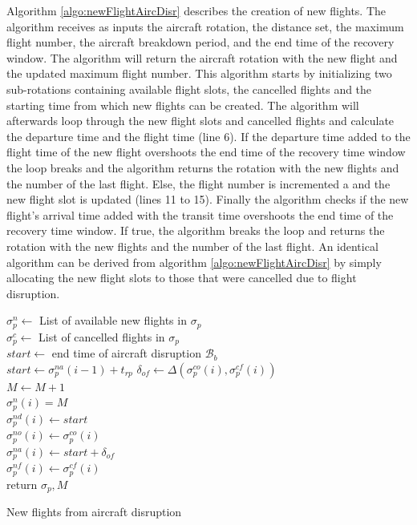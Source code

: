 	
	
	Algorithm \ref{algo:newFlightAircDisr} describes the creation of new flights. The algorithm receives as inputs the aircraft rotation, the distance set, the maximum flight number, the aircraft breakdown period, and the end time of the recovery window. The algorithm will return the aircraft rotation with the new flight and the updated maximum flight number. This algorithm starts by initializing two sub-rotations containing available flight slots, the cancelled flights and the starting time from which new flights can be created. The algorithm will afterwards loop through the new flight slots and cancelled flights and calculate the departure time and the flight time (line 6). If the departure time added to the flight time of the new flight overshoots the end time of the recovery time window the loop breaks and the algorithm returns the rotation with the new flights and the number of the last flight. Else, the flight number is incremented a and the new flight slot is updated (lines 11 to 15). Finally the algorithm checks if the new flight's arrival time added with the transit time overshoots the end time of the recovery time window. If true, the algorithm breaks the loop  and returns the rotation with the new flights and the number of the last flight. An identical algorithm can be derived from algorithm \ref{algo:newFlightAircDisr} by simply allocating the new flight slots to those that were cancelled due to flight disruption.\\
	
	\begin{algorithm}[H]
		\DontPrintSemicolon
		
		$\sigma^n_p \gets$ List of available new flights in $\sigma_p$ \\
		$\sigma^c_p \gets$ List of cancelled flights in $\sigma_p$ \\
		$start \gets$ end time of aircraft disruption $\mathcal{B}_b$\\
		{
			 { $start \gets \sigma^{na}_p(i-1)  + t_{rp}$}
			$\delta_{of} \gets \Delta(\sigma^{co}_p(i), \sigma^{cf}_p(i))$\\
			$M \gets M + 1$\\
			$\sigma^n_p(i) = M$\\
			$\sigma^{nd}_p(i) \gets start$ \\
			$\sigma^{no}_p(i) \gets \sigma^{co}_p(i)$\\
			$\sigma^{na}_p(i) \gets start + \delta_{of}$\\
			$\sigma^{nf}_p(i) \gets \sigma^{cf}_p(i)$\\
		}
		return $\sigma_p, M$
		\caption{New flights from aircraft disruption}
		\label{algo:newFlightAircDisr}
	\end{algorithm}


